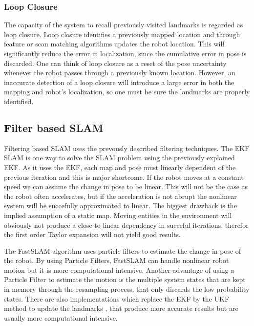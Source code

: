 \subsubsection{Loop Closure}

The capacity of the system to recall previously visited landmarks is regarded as loop closure. Loop closure identifies a previously mapped location and through feature or scan matching algorithms updates the robot location. This will significantly reduce the error in localization, since the cumulative error in pose is discarded. One can think of loop closure as a reset of the pose uncertainty whenever the robot passes through a previously known location. However, an inaccurate detection of a loop closure will introduce a large error in both the mapping and robot's localization, so one must be sure the landmarks are properly identified.

\subsection{Filter based \acs*{SLAM}}

Filtering based \acs*{SLAM} uses the prevously described filtering techniques. The \acs*{EKF} \acs*{SLAM} is one way to solve the \acs*{SLAM} problem using the previously explained \acl*{EKF}. As it uses the \acs*{EKF}, each map and pose must linearly dependent of the previous iteration and this is major shortcome. If the robot moves at a constant speed we can assume the change in pose to be linear. This will not be the case as the robot often accelerates, but if the acceleration is not abrupt the nonlinear system will be succefully approximated to linear. The biggest drawback is the implied assumption of a static map. Moving entities in the environment will obviously not produce a close to linear dependency in succeful iterations, therefor the first order Taylor expansion will not yield good results. 


The FastSLAM algorithm \cite{thrun_fastslam_nodate} uses particle filters to estimate the change in pose of the robot. By using Particle Filters, FastSLAM can handle nonlinear robot motion but it is more computational intensive. Another advantage of using a Particle Filter to estimate the motion is the multiple system states that are kept in memory through the resampling process, that only discards the low probability states. There are also implementations which replace the \acs*{EKF} by the \acs*{UKF} method to update the landmarks \cite{wang_upf-ukf_2007}, that produce more accurate results but are usually more computational intensive.


